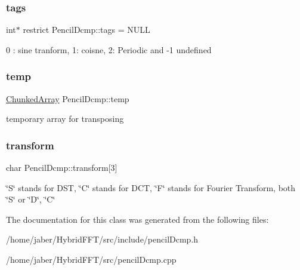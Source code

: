 \subsubsection{\texorpdfstring{tags}{tags}}
{\footnotesize\ttfamily int$\ast$ restrict Pencil\+Dcmp\+::tags = N\+U\+LL\hspace{0.3cm}{\ttfamily [protected]}}

0 \+: sine tranform, 1\+: coisne, 2\+: Periodic and -\/1 undefined \mbox{\label{classPencilDcmp_a229ec3f8be3816c1b7ffe2e7979fe542}} 
\subsubsection{\texorpdfstring{temp}{temp}}
{\footnotesize\ttfamily \mbox{\hyperlink{classChunkedArray}{Chunked\+Array}} Pencil\+Dcmp\+::temp\hspace{0.3cm}{\ttfamily [protected]}}

temporary array for transposing \mbox{\label{classPencilDcmp_ab98fa8acc24281443f45521fd71de8d3}} 
\subsubsection{\texorpdfstring{transform}{transform}}
{\footnotesize\ttfamily char Pencil\+Dcmp\+::transform\mbox{[}3\mbox{]}\hspace{0.3cm}{\ttfamily [protected]}}

\char`\"{}\+S\char`\"{} stands for D\+ST, \char`\"{}\+C\char`\"{} stands for D\+CT, \char`\"{}\+F\char`\"{} stands for Fourier Transform, both \char`\"{}\+S\char`\"{} or \char`\"{}\+D\char`\"{}, \char`\"{}\+C\char`\"{} 

The documentation for this class was generated from the following files\+:\begin{DoxyCompactItemize}
\item 
/home/jaber/\+Hybrid\+F\+F\+T/src/include/pencil\+Dcmp.\+h\item 
/home/jaber/\+Hybrid\+F\+F\+T/src/pencil\+Dcmp.\+cpp\end{DoxyCompactItemize}
